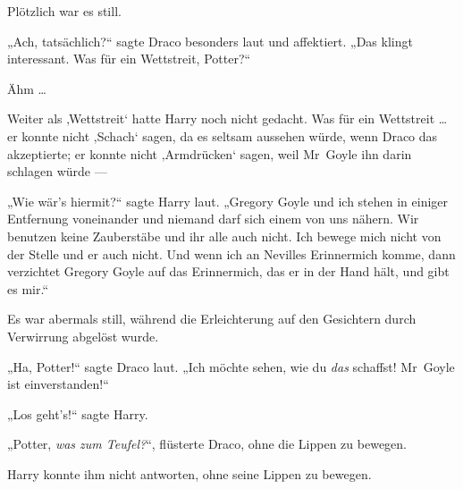 Plötzlich war es still.

„Ach, tatsächlich?“ sagte Draco besonders laut und affektiert.
„Das klingt interessant. Was für ein Wettstreit, Potter?“

Ähm …

Weiter als ‚Wettstreit‘ hatte Harry noch nicht gedacht. Was für ein Wettstreit … er konnte nicht ‚Schach‘ sagen, da es seltsam aussehen würde, wenn Draco das akzeptierte; er konnte nicht ‚Armdrücken‘ sagen, weil Mr~Goyle ihn darin schlagen würde —

„Wie wär’s hiermit?“ sagte Harry laut.
„Gregory Goyle und ich stehen in einiger Entfernung voneinander und niemand darf sich einem von uns nähern. Wir benutzen keine Zauberstäbe und ihr alle auch nicht. Ich bewege mich nicht von der Stelle und er auch nicht. Und wenn ich an Nevilles Erinnermich komme, dann verzichtet Gregory Goyle auf das Erinnermich, das er in der Hand hält, und gibt es mir.“

Es war abermals still, während die Erleichterung auf den Gesichtern durch Verwirrung abgelöst wurde.

„Ha, Potter!“ sagte Draco laut.
„Ich möchte sehen, wie du \emph{das} schaffst! Mr~Goyle ist einverstanden!“

„Los geht’s!“ sagte Harry.

„Potter, \emph{was zum Teufel?}“, flüsterte Draco, ohne die Lippen zu bewegen.

Harry konnte ihm nicht antworten, ohne seine Lippen zu bewegen.

